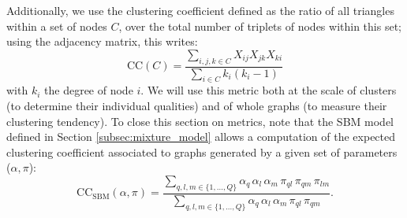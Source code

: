 \documentclass[switch, 12pt]{article}
\newcommand{\intset}[2]{\{#1, ..., #2\}}
\begin{document}
\begin{multicols}{2}
    Additionally, we use the clustering coefficient defined as the ratio of all triangles within a set of nodes $C$, over the total number of triplets of nodes within this set; using the adjacency matrix, this writes:
    \begin{equation}
        \mathrm{CC}(C) = \frac{\displaystyle \sum_{i, j, k \in C} X_{ij} X_{jk} X_{ki}}{\displaystyle
            \sum_{i \in C} k_i (k_i - 1)}
    \end{equation}
    with $k_i$ the degree of node $i$. We will use this metric both at the scale of clusters (to determine their individual qualities) and of whole graphs (to measure their clustering tendency). To close this section on metrics, note that the SBM model defined in Section \ref{subsec:mixture_model} allows a computation of the expected clustering coefficient associated to graphs generated by a given set of parameters ($\alpha, \pi$):
    \begin{equation}
        \label{eq:SBM_CC}
        \mathrm{CC}_{\mathrm{SBM}}(\alpha, \pi) = \frac{\displaystyle  \sum_{q, l, m \in \intset{1}{Q}} \alpha_q \, \alpha_l \, \alpha_m \, \pi_{ql} \, \pi_{qm} \, \pi_{lm}}{\displaystyle  \sum_{q, l, m \in \intset{1}{Q}} \alpha_q \, \alpha_l \, \alpha_m \, \pi_{ql} \, \pi_{qm}}.
    \end{equation}



\end{multicols}
\end{document}
